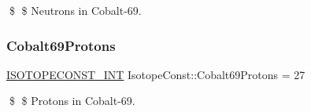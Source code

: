 \$ \$ Neutrons in Cobalt-\/69. \mbox{\label{group___isotope_const-_cobalt-_co69_ga0be3db52a4384d575dd7c3f5fc9edcc7}} 
\subsubsection{\texorpdfstring{Cobalt69\+Protons}{Cobalt69Protons}}
{\footnotesize\ttfamily \mbox{\hyperlink{group___isotope_const-_macros_ga5f18360b3e99483a35c32d789e62621c}{I\+S\+O\+T\+O\+P\+E\+C\+O\+N\+S\+T\+\_\+\+I\+NT}} Isotope\+Const\+::\+Cobalt69\+Protons = 27}

\$ \$ Protons in Cobalt-\/69. 